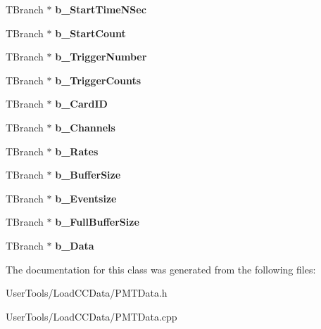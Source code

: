 \begin{DoxyCompactItemize}
\item 
\hypertarget{classPMTData_adf7cd7729bb5bba9ad630deb52f59946}{T\-Branch $\ast$ {\bfseries b\-\_\-\-Start\-Time\-N\-Sec}}\label{classPMTData_adf7cd7729bb5bba9ad630deb52f59946}

\item 
\hypertarget{classPMTData_a76e691f68bd678cfcee9abd08ac96ed6}{T\-Branch $\ast$ {\bfseries b\-\_\-\-Start\-Count}}\label{classPMTData_a76e691f68bd678cfcee9abd08ac96ed6}

\item 
\hypertarget{classPMTData_a086214097320d5797cc153f1b27f0bef}{T\-Branch $\ast$ {\bfseries b\-\_\-\-Trigger\-Number}}\label{classPMTData_a086214097320d5797cc153f1b27f0bef}

\item 
\hypertarget{classPMTData_a9265633fa545a406faeda273716b3e11}{T\-Branch $\ast$ {\bfseries b\-\_\-\-Trigger\-Counts}}\label{classPMTData_a9265633fa545a406faeda273716b3e11}

\item 
\hypertarget{classPMTData_a6f2ac15158ae8a458f56cce652ea9f6d}{T\-Branch $\ast$ {\bfseries b\-\_\-\-Card\-I\-D}}\label{classPMTData_a6f2ac15158ae8a458f56cce652ea9f6d}

\item 
\hypertarget{classPMTData_ac08cb29ec61c1d945fbf6893c2f80b90}{T\-Branch $\ast$ {\bfseries b\-\_\-\-Channels}}\label{classPMTData_ac08cb29ec61c1d945fbf6893c2f80b90}

\item 
\hypertarget{classPMTData_a29343471536481bcfa94d746958018d2}{T\-Branch $\ast$ {\bfseries b\-\_\-\-Rates}}\label{classPMTData_a29343471536481bcfa94d746958018d2}

\item 
\hypertarget{classPMTData_a4df357ba10b131aa5a2886ccf08899fa}{T\-Branch $\ast$ {\bfseries b\-\_\-\-Buffer\-Size}}\label{classPMTData_a4df357ba10b131aa5a2886ccf08899fa}

\item 
\hypertarget{classPMTData_a66261088f4371dc96d62f508178e6a91}{T\-Branch $\ast$ {\bfseries b\-\_\-\-Eventsize}}\label{classPMTData_a66261088f4371dc96d62f508178e6a91}

\item 
\hypertarget{classPMTData_a26d8366646579d0a26a951c9bde9a6b0}{T\-Branch $\ast$ {\bfseries b\-\_\-\-Full\-Buffer\-Size}}\label{classPMTData_a26d8366646579d0a26a951c9bde9a6b0}

\item 
\hypertarget{classPMTData_a19565c90684786dc6221282ba7e1305c}{T\-Branch $\ast$ {\bfseries b\-\_\-\-Data}}\label{classPMTData_a19565c90684786dc6221282ba7e1305c}

\end{DoxyCompactItemize}


The documentation for this class was generated from the following files\-:\begin{DoxyCompactItemize}
\item 
User\-Tools/\-Load\-C\-C\-Data/P\-M\-T\-Data.\-h\item 
User\-Tools/\-Load\-C\-C\-Data/P\-M\-T\-Data.\-cpp\end{DoxyCompactItemize}
